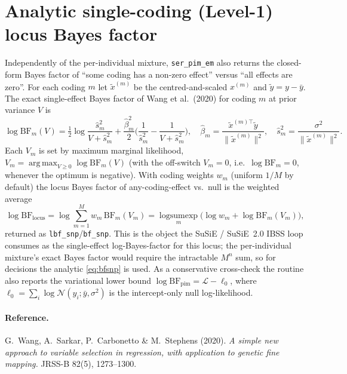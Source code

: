 \documentclass[11pt]{article}
\newcommand{\Nor}{\mathcal{N}}
\newcommand{\sigsq}{\sigma^{2}}
\newcommand{\half}{\tfrac{1}{2}}
\DeclareMathOperator*{\argmax}{arg\,max}
\theoremstyle{plain}
\theoremstyle{remark}
\begin{document}
\appendix
\section{Analytic single-coding (Level-1) locus Bayes factor}\label{app:bf}

Independently of the per-individual mixture, \texttt{ser\_pim\_em} also returns
the closed-form Bayes factor of ``some coding has a non-zero effect'' versus
``all effects are zero''. For each coding $m$ let $\tilde x^{(m)}$ be the
centred-and-scaled $x^{(m)}$ and $\tilde y=y-\bar y$. The exact single-effect
Bayes factor of Wang et al.\ (2020) for coding $m$ at prior variance $V$ is
\begin{equation}\label{eq:bf1}
  \log\mathrm{BF}_m(V)
  =\half\log\frac{\hat s_m^2}{V+\hat s_m^2}
   +\frac{\hat\beta_m^2}{2}\Big(\frac{1}{\hat s_m^2}-\frac{1}{V+\hat s_m^2}\Big),
  \quad
  \hat\beta_m=\frac{\tilde x^{(m)\top}\tilde y}{\|\tilde x^{(m)}\|^2},
  \quad
  \hat s_m^2=\frac{\sigsq}{\|\tilde x^{(m)}\|^2}.
\end{equation}
Each $V_m$ is set by maximum marginal likelihood,
$V_m=\argmax_{V\ge 0}\log\mathrm{BF}_m(V)$ (with the off-switch $V_m=0$, i.e.\
$\log\mathrm{BF}_m=0$, whenever the optimum is negative). With coding weights
$w_m$ (uniform $1/M$ by default) the locus Bayes factor of any-coding-effect vs.\
null is the weighted average
\begin{equation}\label{eq:bfsnp}
  \log\mathrm{BF}_{\mathrm{locus}}
  =\log\sum_{m=1}^{M} w_m\,\mathrm{BF}_m(V_m)
  =\operatorname*{logsumexp}_{m}\!\big(\log w_m+\log\mathrm{BF}_m(V_m)\big),
\end{equation}
returned as \texttt{lbf\_snp}/\texttt{bf\_snp}. This is the object the SuSiE /
SuSiE~2.0 IBSS loop consumes as the single-effect log-Bayes-factor for this
locus; the per-individual mixture's exact Bayes factor would require the
intractable $M^{n}$ sum, so for decisions the analytic \eqref{eq:bfsnp} is used.
As a conservative cross-check the routine also reports the variational lower
bound $\log\mathrm{BF}_{\mathrm{pim}}=\mathcal L-\ell_0$, where
$\ell_0=\sum_i\log\Nor(y_i;\bar y,\sigsq)$ is the intercept-only null
log-likelihood.

\paragraph{Reference.}
G.\ Wang, A.\ Sarkar, P.\ Carbonetto \& M.\ Stephens (2020).
\textit{A simple new approach to variable selection in regression, with
application to genetic fine mapping.} JRSS-B 82(5), 1273--1300.
\end{document}

